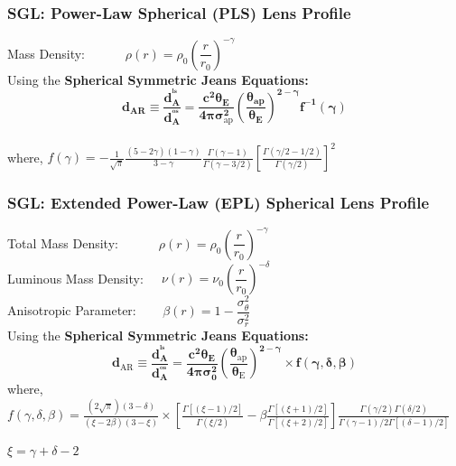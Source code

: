 \documentclass[xcolor=table,bigger]{beamer}
\begin{document}
\begin{frame}
 \frametitle{\textbf{SGL}: { {\large Power-Law Spherical (PLS) Lens Profile}}}
 Mass Density:  $~~~~~~~~~~~~~\rho(r)=\rho_{0}\left(\dfrac{r}{r_{0}}\right)^{-\gamma}$ 
\vspace{3mm}\\
Using the \textbf{Spherical Symmetric Jeans Equations:} 
$$
{\boxed{\boldsymbol{d_{AR} \equiv \dfrac{d_{A}^{^{l s}}}{d_{A}^{^{os}}}=\dfrac{c^{2} \theta_{E}}{4 \pi \sigma_{\mathrm{ap}}^{2}}\left(\dfrac{\theta_{a p}}{\theta_{E}}\right)^{2-\gamma} f^{-1}(\gamma)}}}
$$
\vspace{3mm}\\
 where,
 $f(\gamma)=-\frac{1}{\sqrt{\pi}} \frac{(5-2 \gamma)(1-\gamma)}{3-\gamma} \frac{\Gamma(\gamma-1)}{\Gamma(\gamma-3 / 2)}\left[\frac{\Gamma(\gamma / 2-1 / 2)}{\Gamma(\gamma / 2)}\right]^{2}$\\
\end{frame}
\begin{frame}
 \frametitle{\textbf{SGL}: {\normalsize Extended Power-Law (EPL) Spherical Lens Profile}}
 Total Mass Density:  $~~~~~~~~~~~~~\rho(r)=\rho_{0}\left(\dfrac{r}{r_{0}}\right)^{-\gamma}$ 
\vspace{2mm}\\
 Luminous Mass Density: $~~~~~\nu(r)=\nu_{0}\left(\dfrac{r}{r_{0}}\right)^{-\delta}$
\vspace{2mm}\\
 Anisotropic Parameter: $~~~~~~~~\beta(r)=1-\dfrac{\sigma_{\theta}^{2}}{ \sigma_{r}^{2}}$
\vspace{3mm}\\
Using the \textbf{Spherical Symmetric Jeans Equations:} 
$$
{\boxed{\boldsymbol{d_{\mathrm{AR}} \equiv \dfrac{d_{A}^{^{ls}}}{d_{A}^{^{os}}}=\dfrac{c^{2} \theta_{E}}{4 \pi \sigma_{0}^{2}}\left(\dfrac{\theta_{\mathrm{ap}}}{\theta_{\mathrm{E}}}\right)^{2-\gamma} \times f(\gamma, \delta, \beta)}}}
$$
 where,
 $f(\gamma, \delta, \beta)=\frac{(2 \sqrt{\pi})(3-\delta)}{(\xi-2 \beta)(3-\xi)} \times\left[\frac{\Gamma[(\xi-1) / 2]}{\Gamma(\xi / 2)}-\beta \frac{\Gamma[(\xi+1) / 2]}{\Gamma[(\xi+2) / 2]}\right] \frac{\Gamma(\gamma / 2) \Gamma(\delta / 2)}{\Gamma(\gamma-1) / 2 \Gamma[(\delta-1) / 2]}$\\
 \begin{flushright}
 $\xi=\gamma+\delta-2$
 \end{flushright}
\end{frame}
\end{document}
